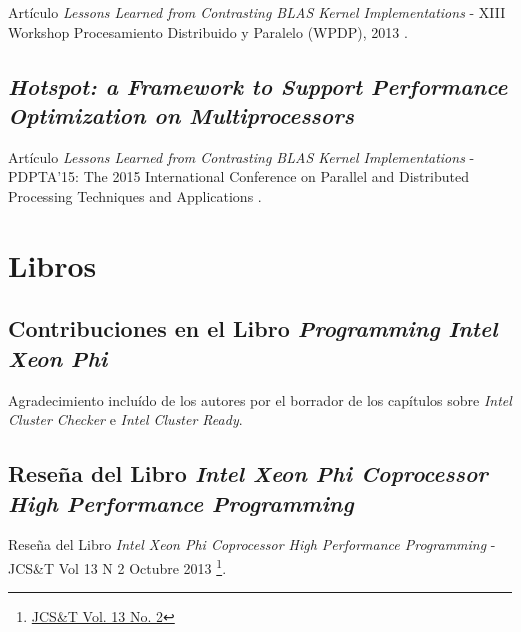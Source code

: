 \documentclass[a4paper]{report}
\begin{document}
Artículo {\it Lessons Learned from Contrasting BLAS Kernel Implementations} - XIII Workshop Procesamiento Distribuido y Paralelo (WPDP), 2013 \cite{lessons}.



\subsection{{\it Hotspot: a Framework to Support Performance Optimization on Multiprocessors}}

Artículo {\it Lessons Learned from Contrasting BLAS Kernel Implementations} - PDPTA'15: The 2015 International Conference on Parallel and Distributed Processing Techniques and Applications \cite{hotspot-paper}.



\section{Libros}

\subsection{Contribuciones en el Libro {\it Programming Intel Xeon Phi}}

Agradecimiento incluído de los autores por el borrador de los capítulos sobre {\it Intel Cluster Checker} e {\it Intel Cluster Ready}.

\subsection{Reseña del Libro {\it Intel Xeon Phi Coprocessor High Performance Programming}}

Reseña del Libro {\it Intel Xeon Phi Coprocessor High Performance Programming} - JCS\&T Vol 13 N 2 Octubre 2013 \footnote{\href{http://journal.info.unlp.edu.ar/journal/journal36/papers/JCST-Oct13-BR1.pdf}{JCS\&T Vol. 13 No. 2}}.


\end{document}
